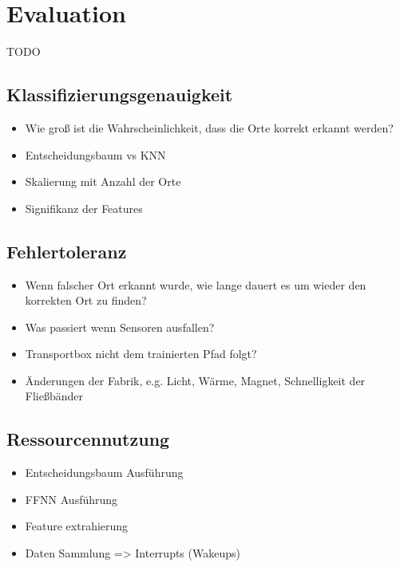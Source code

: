 \chapter{Evaluation}
TODO

\section{Klassifizierungsgenauigkeit}
\begin{itemize}
    \item Wie groß ist die Wahrscheinlichkeit, dass die Orte korrekt erkannt werden?
    \item Entscheidungsbaum vs KNN
    \item Skalierung mit Anzahl der Orte
    \item Signifikanz der Features
\end{itemize}

\section{Fehlertoleranz}
\begin{itemize}
    \item Wenn falscher Ort erkannt wurde, wie lange dauert es um wieder den korrekten Ort zu finden?
    \item Was passiert wenn Sensoren ausfallen?
    \item Transportbox nicht dem trainierten Pfad folgt?
    \item Änderungen der Fabrik, e.g. Licht, Wärme, Magnet, Schnelligkeit der Fließbänder
\end{itemize}

\section{Ressourcennutzung}
\begin{itemize}
    \item Entscheidungsbaum Ausführung
    \item FFNN Ausführung
    \item Feature extrahierung
    \item Daten Sammlung => Interrupts (Wakeups)
\end{itemize}
